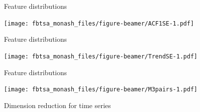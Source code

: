 \documentclass[14pt,ignorenonframetext,]{beamer}
\begin{document}
\begin{frame}{Feature distributions}
\protect\hypertarget{feature-distributions}{}

\texttt{[image: fbtsa\_monash\_files/figure-beamer/ACF1SE-1.pdf]}

\end{frame}

\begin{frame}{Feature distributions}
\protect\hypertarget{feature-distributions-1}{}

\texttt{[image: fbtsa\_monash\_files/figure-beamer/TrendSE-1.pdf]}

\end{frame}

\begin{frame}{Feature distributions}
\protect\hypertarget{feature-distributions-2}{}

\texttt{[image: fbtsa\_monash\_files/figure-beamer/M3pairs-1.pdf]}

\end{frame}

\begin{frame}{Dimension reduction for time series}
\protect\hypertarget{dimension-reduction-for-time-series}{}





\end{frame}
\end{document}
